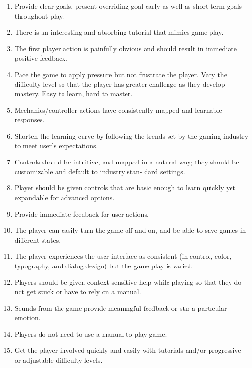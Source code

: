 \begin{enumerate}
	\item Provide clear goals, present overriding goal early as well as short-term goals throughout play.
	\item There is an interesting and absorbing tutorial that mimics game play.
	\item The first player action is painfully obvious and should result in immediate positive feedback.
	\item Pace the game to apply pressure but not frustrate the player. Vary the difficulty level so that the player has greater challenge as they develop mastery. Easy to learn, hard to master.
	\item Mechanics/controller actions have consistently mapped and learnable responses.
	\item Shorten the learning curve by following the trends set by the gaming industry to meet user’s expectations.
	\item Controls should be intuitive, and mapped in a natural way; they should be customizable and default to industry stan- dard settings.
	\item Player should be given controls that are basic enough to learn quickly yet expandable for advanced options.
	\item Provide immediate feedback for user actions.
	\item The player can easily turn the game off and on, and be able to save games in different states.
	\item The player experiences the user interface as consistent (in control, color, typography, and dialog design) but the game play is varied.
	\item Players should be given context sensitive help while playing so that they do not get stuck or have to rely on a manual.
	\item Sounds from the game provide meaningful feedback or stir a particular emotion.
	\item Players do not need to use a manual to play game.
	\item Get the player involved quickly and easily with tutorials and/or progressive or adjustable difficulty levels.
\end{enumerate}

